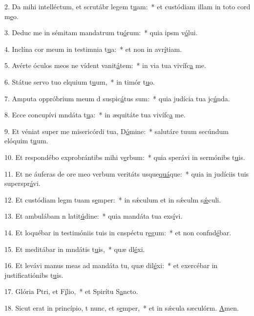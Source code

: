 2. Da mihi intelléctum, et scrutábr legem t\uline{u}am:~* et custódiam illam in toto cord m\uline{e}o.\par 
3. Deduc me in sémitam mandatrum tu\uline{ó}rum:~* quia ipsm v\uline{ó}lui.\par 
4. Inclína cor meum in testimnia t\uline{u}a:~* et non in avr\uline{í}tiam.\par 
5. Avérte óculos meos ne vídent vanit\uline{á}tem:~* in via tua vivífc\uline{a} me.\par 
6. Státue servo tuo elquium t\uline{u}um,~* in timór t\uline{u}o.\par 
7. Amputa oppróbrium meum d suspic\uline{á}tus sum:~* quia judícia tua jc\uline{ú}nda.\par 
8. Ecce concupívi mndáta t\uline{u}a:~* in æquitáte tua vivífc\uline{a} me.\par 
9. Et véniat super me misericórdi tua, D\uline{ó}mine:~* salutáre tuum secúndum elóquim t\uline{u}um.\par 
10. Et respondébo exprobrántibs mihi v\uline{e}rbum:~* quia sperávi in sermónibs t\uline{u}is.\par 
11. Et ne áuferas de ore meo verbum veritáts usque\uline{quá}que:~* quia in judíciis tuis superspr\uline{á}vi.\par 
12. Et custódiam legm tuam s\uline{e}mper:~* in sǽculum et in sǽculm s\uline{ǽ}culi.\par 
13. Et ambulábam n latit\uline{ú}dine:~* quia mandáta tua exs\uline{í}vi.\par 
14. Et loquébar in testimóniis tuis in cnspéctu r\uline{e}gum:~* et non confnd\uline{é}bar.\par 
15. Et meditábar in mndátis t\uline{u}is,~* quæ dl\uline{é}xi.\par 
16. Et levávi manus meas ad mandáta tu, quæ dil\uline{é}xi:~* et exercébar in justificatiónibs t\uline{u}is.\par 
17. Glória Ptri, et F\uline{í}lio,~* et Spirítu S\uline{a}ncto.\par 
18. Sicut erat in princípio, t nunc, et s\uline{e}mper,~* et in sǽcula sæculórm. \uline{A}men.\par 
